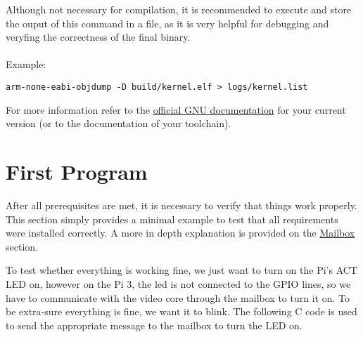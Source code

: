 \documentclass[12pt]{book}
\begin{document}
Although not necessary for compilation, it is recommended to execute and store the ouput of this command in a file, as it is very helpful for debugging and veryfing the correctness of the final binary.
\\~\\
Example:
\begin{lstlisting}[style = bash, xleftmargin=0\textwidth]
	arm-none-eabi-objdump -D build/kernel.elf > logs/kernel.list
\end{lstlisting}

For more information refer to the \href{https://gcc.gnu.org/onlinedocs/}{official GNU documentation} for your current version (or to the documentation of your toolchain).

\section{First Program}
\label{sec:frist program}

After all prerequisites are met, it is necessary to verify that things work properly. This section simply provides a minimal example to test that all requirements were installed correctly. A more in depth explanation is provided on the \hyperref[sec:mailbox]{Mailbox} section.

To test whether everything is working fine, we just want to turn on the Pi's ACT LED on, however on the Pi 3, the led is not connected to the GPIO lines, so we have to communicate with the video core through the mailbox to turn it on. To be extra-sure everything is fine, we want it to blink. The following C code is used to send the appropriate message to the mailbox to turn the LED on.
\end{document}
